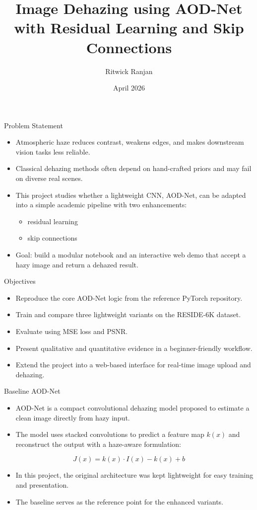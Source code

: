 \documentclass[aspectratio=169]{beamer}
\title[Image Dehazing with AOD-Net]{Image Dehazing using AOD-Net\\with Residual Learning and Skip Connections}
\author{Ritwick Ranjan}
\institute{Department of Computer Science \\ IIT Dharwad}
\date{April 2026}
\begin{document}
\begin{frame}
  \titlepage
\end{frame}

\begin{frame}{Problem Statement}
  \begin{itemize}
    \item Atmospheric haze reduces contrast, weakens edges, and makes downstream vision tasks less reliable.
    \item Classical dehazing methods often depend on hand-crafted priors and may fail on diverse real scenes.
    \item This project studies whether a lightweight CNN, AOD-Net, can be adapted into a simple academic pipeline with two enhancements:
    \begin{itemize}
      \item residual learning
      \item skip connections
    \end{itemize}
    \item Goal: build a modular notebook and an interactive web demo that accept a hazy image and return a dehazed result.
  \end{itemize}
\end{frame}

\begin{frame}{Objectives}
  \begin{itemize}
    \item Reproduce the core AOD-Net logic from the reference PyTorch repository.
    \item Train and compare three lightweight variants on the RESIDE-6K dataset.
    \item Evaluate using MSE loss and PSNR.
    \item Present qualitative and quantitative evidence in a beginner-friendly workflow.
    \item Extend the project into a web-based interface for real-time image upload and dehazing.
  \end{itemize}
\end{frame}

\begin{frame}{Baseline AOD-Net}
  \begin{itemize}
    \item AOD-Net is a compact convolutional dehazing model proposed to estimate a clean image directly from hazy input.
    \item The model uses stacked convolutions to predict a feature map \(k(x)\) and reconstruct the output with a haze-aware formulation:
  \end{itemize}
  \[
    J(x) = k(x)\cdot I(x) - k(x) + b
  \]
  \begin{itemize}
    \item In this project, the original architecture was kept lightweight for easy training and presentation.
    \item The baseline serves as the reference point for the enhanced variants.
  \end{itemize}
\end{frame}
\end{document}
